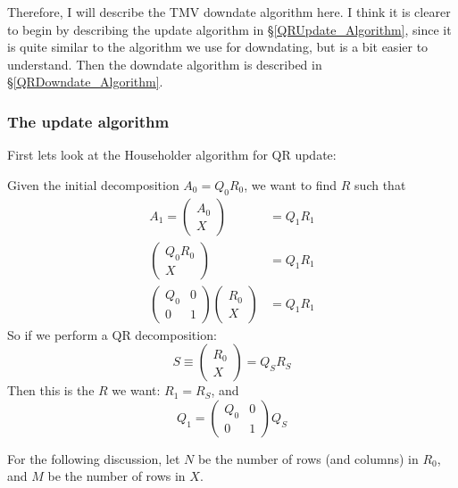 \documentclass[twoside,letterpaper,11pt]{article}
\begin{document}
Therefore, I will describe the TMV downdate algorithm here.  I think it is clearer to 
begin by describing the update algorithm in \S\ref{QRUpdate_Algorithm}, since it 
is quite similar to the algorithm we use for downdating, but is a bit easier to 
understand.  Then the downdate algorithm
is described in \S\ref{QRDowndate_Algorithm}.

\subsubsection{The update algorithm}
\label{QRUpdate_Algorithm}

First lets look at the Householder algorithm for QR update:

Given the initial decomposition $A_0 = Q_0 R_0$, we want to find $R$ such that
\begin{align*}
A_1 = \left(\begin{array}{c}A_0 \\ X \end{array}\right) &= Q_1 R_1 \\
\left(\begin{array}{c}Q_0 R_0 \\ X \end{array}\right) &= Q_1 R_1 \\
\left(\begin{array}{cc}Q_0 & 0 \\ 0 & 1 \end{array}\right) 
\left(\begin{array}{c}R_0 \\ X \end{array}\right) &= Q_1 R_1 
\end{align*}
So if we perform a QR decomposition: 
\begin{equation*}
S \equiv \left(\begin{array}{c}R_0 \\ X \end{array}\right) = Q_S R_S
\end{equation*}
Then this is the $R$ we want: $R_1 = R_S$, and 
\begin{equation*}
Q_1 = \left(\begin{array}{cc}Q_0 & 0 \\ 0 & 1 \end{array}\right)  Q_S
\end{equation*}

For the following discussion, let $N$ be the number of rows (and columns) in $R_0$,
and $M$ be the number of rows in $X$.
\end{document}
